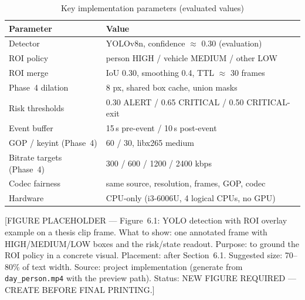 \begin{table}[H]
\centering
\caption{Key implementation parameters (evaluated values)}
\label{tab:params}
\begin{tabular}{|l|l|}
\hline
\textbf{Parameter} & \textbf{Value} \\
\hline
Detector & YOLOv8n, confidence $\approx$ 0.30 (evaluation) \\
ROI policy & person HIGH / vehicle MEDIUM / other LOW \\
ROI merge & IoU 0.30, smoothing 0.4, TTL $\approx$ 30 frames \\
Phase~4 dilation & 8 px, shared box cache, union masks \\
Risk thresholds & 0.30 ALERT / 0.65 CRITICAL / 0.50 CRITICAL-exit \\
Event buffer & 15\,s pre-event / 10\,s post-event \\
GOP / keyint (Phase~4) & 60 / 30, libx265 medium \\
Bitrate targets (Phase~4) & 300 / 600 / 1200 / 2400 kbps \\
Codec fairness & same source, resolution, frames, GOP, codec \\
Hardware & CPU-only (i3-6006U, 4 logical CPUs, no GPU) \\
\hline
\end{tabular}
\end{table}

[FIGURE PLACEHOLDER --- Figure~6.1: YOLO detection with ROI overlay example on a thesis clip frame. What to show: one annotated frame with HIGH/MEDIUM/LOW boxes and the risk/state readout. Purpose: to ground the ROI policy in a concrete visual. Placement: after Section~6.1. Suggested size: 70--80\% of text width. Source: project implementation (generate from \texttt{day\_person.mp4} with the preview path). Status: NEW FIGURE REQUIRED --- CREATE BEFORE FINAL PRINTING.]

